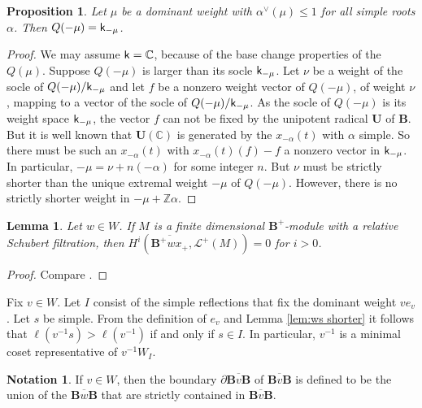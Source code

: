 \documentclass[sn-mathphys-num]{sn-jnl}%
\newcommand{\Ll}{\mathcal L}
\newcommand{\sk}{{\sf k}}
\newcommand{\Z}{{\mathbb Z}}
\newcommand{\cC}{{\mathbb C}}
\newcommand{\fb}{\mathbf B}
\newcommand{\bu}{\mathbf U}
\newtheorem{lemma}[theorem]{Lemma}
\newtheorem{proposition}[theorem]{Proposition}
\theoremstyle{definition}
\newtheorem{notation}[theorem]{Notation}
\begin{document}
\begin{proposition}\label{prop:1dimQ}Let $\mu$ be a dominant weight with  $\alpha^\vee (\mu)\leq1$ for all simple roots $\alpha$.
Then
 $Q(-\mu)=\sk_{-\mu}$.
 \end{proposition}
 \begin{proof}
 
 We may assume $\sk=\cC$, because of the base change properties \cite[Chapter 7]{WvdKTata} of the $Q(\mu)$.
 Suppose $Q(-\mu)$ is larger than its socle $\sk_{-\mu}$. Let $\nu$ be a weight of the socle of $Q(-\mu)/\sk_{-\mu}$
 and let $f$ be a nonzero weight vector of $Q(-\mu)$, of weight $\nu$, 
 mapping to a vector of the socle of $Q(-\mu)/\sk_{-\mu}$.
 As the socle of $Q(-\mu)$ is its weight space $\sk_{-\mu}$, the vector  $f$ can not be fixed by the unipotent radical $\bu$
 of $\fb$. But it is well known
 that  $\bu(\cC)$ is generated by the $x_{-\alpha}(t)$ with $\alpha$ simple. So there must be such an $x_{-\alpha}(t)$ with 
 $x_{-\alpha}(t)(f)-f$ a nonzero vector in $\sk_{-\mu}$. In particular, $-\mu=\nu + n(-\alpha)$ for some integer $n$. But $\nu$
 must be strictly shorter than the unique extremal weight $-\mu$ of $Q(-\mu)$. However, there is no strictly shorter 
 weight in $-\mu +\Z\alpha$.
 \end{proof}
 
  \begin{lemma}\label{lem:Q acyclic}Let $w\in W$.
If $M$ is a finite dimensional $ \fb^+$-module with a relative Schubert filtration,
then $H^i(\overline{ \fb^+wx_+},\Ll^+(M))=0$ for $i>0$.
\end{lemma}
\begin{proof}
Compare \cite[Theorem 1.9.(a)(ii)]{WvdK}.
\end{proof}

 
 Fix $v\in W$. Let $I$ consist of the simple reflections that fix the dominant weight $ve_v$. 
 Let $s$ be simple.
 From  the definition of $e_v$ and Lemma \ref{lem:ws shorter} it follows that $\ell(v^{-1}s)>\ell(v^{-1})$ if and only if $s\in I$. 
 In particular, $v^{-1}$ is a minimal coset representative of $v^{-1}W_I$.

\begin{notation}
    If $v\in W$, then the boundary $\partial\overline{{\fb}v\fb}$ of 
    $\overline{{\fb}v\fb}$ is defined to be the union of the $\overline{{\fb}w\fb}$
    that are strictly contained in $\overline{{\fb}v\fb}$.
\end{notation}
\end{document}
